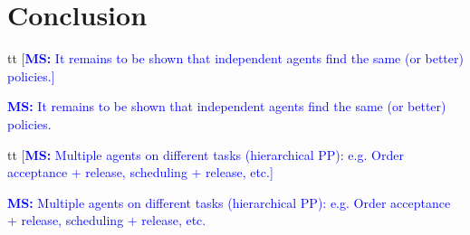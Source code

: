 \documentclass[envcountsame]{llncs}
\newcommand\MS[2][r]{\ifx t#1 \textcolor{blue}{[\textbf{MS:} #2]}
  \else \begin{center}\textcolor{blue}{\textbf{MS:} #2} \end{center} \fi}
\begin{document}



\section{Conclusion}
\label{sec:conclusion}



\MS[t]{It remains to be shown that independent agents find the same (or better) policies.}

\MS[t]{Multiple agents on different tasks (hierarchical PP): e.g. Order acceptance + release,
  scheduling + release, etc.}

\end{document}
